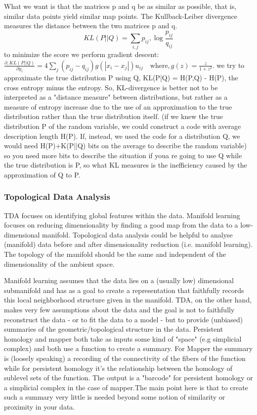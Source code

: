 \documentclass[11pt]{article}
\begin{document}
What we want is that the matrices p and q be as similar as possible, that is, similar data points yield similar map points.
The Kullback-Leiber divergence measures the distance between the two matrices p and q. 
\begin{equation}
KL(P||Q) = \sum_{i, j} p_{ij} , \log \frac{p_{ij}}{q_{ij}}
\end{equation}
to minimize the score we perform gradient descent:
\(\frac{\partial , KL(P || Q)}{\partial y_i} = 4 \sum_j (p_{ij} - q_{ij}) g\left( \left| x_i - x_j\right| \right) u_{ij} \quad \textrm{where} , g(z) = \frac{z}{1+z^2}.\)
we try to approximate the true distribution P using Q, KL(P|Q) = H(P,Q) - H(P), the cross entropy minus the entropy.
So, KL-divergence is better not to be interpreted as a "distance measure" between distributions, but rather as a measure of entropy increase due to the use of an approximation to the true distribution rather than the true distribution itself. (if we knew the true distribution P of the random variable, we could construct a code with average description length H(P). If, instead, we used the code for a distribution Q, we would need H(P)+K(P||Q) bits on the average to describe the random variable) so you need more bits to describe the situation if youa re going to use Q while the true distribution is P, so what KL measures is the inefficiency caused by the approximation of Q to P.

\subsubsection{Topological Data Analysis}
TDA focuses on identifying global features within the data.
Manifold learning focuses on reducing dimensionality by finding a good map from the data to a low-dimensional manifold. Topological data analysis could be helpful to analyse (manifold) data before and after dimensionality reduction (i.e. manifold learning). The topology of the manifold should be the same and independent of the dimensionality of the ambient space.

Manifold learning assumes that the data lies on a (usually low) dimensional submanifold and has as a goal to create a representation that faithfully records this local neighborhood structure given in the manifold. 
TDA, on the other hand, makes very few assumptions about the data and the goal is not to faithfully reconstruct the data - or to fit the data to a model - but to provide (unbiased) summaries of the geometric/topological structure in the data.
Persistent homology and mapper both take as inputs some kind of "space" (e.g simplicial complex) and both use a function to create a summary. For Mapper the summary is (loosely speaking) a recording of the connectivity of the fibers of the  function while for persistent homology it's the relationship between the homology of sublevel sets of the function. The output is a "barcode" for persistent homology or a simplicial complex in the case of mapper.The main point here is that to create such a summary very little is needed beyond some notion of similarity or proximity in your data.
\end{document}
